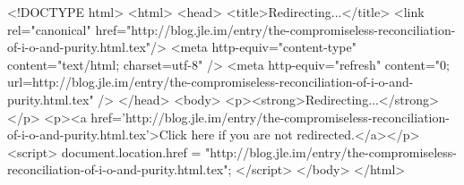 <!DOCTYPE html>
<html>
<head>
<title>Redirecting...</title>
<link rel="canonical" href="http://blog.jle.im/entry/the-compromiseless-reconciliation-of-i-o-and-purity.html.tex"/>
<meta http-equiv="content-type" content="text/html; charset=utf-8" />
<meta http-equiv="refresh" content="0; url=http://blog.jle.im/entry/the-compromiseless-reconciliation-of-i-o-and-purity.html.tex" />
</head>
<body>
  <p><strong>Redirecting...</strong></p>
  <p><a href='http://blog.jle.im/entry/the-compromiseless-reconciliation-of-i-o-and-purity.html.tex'>Click here if you are not redirected.</a></p>
  <script>
    document.location.href = "http://blog.jle.im/entry/the-compromiseless-reconciliation-of-i-o-and-purity.html.tex";
  </script>
</body>
</html>
